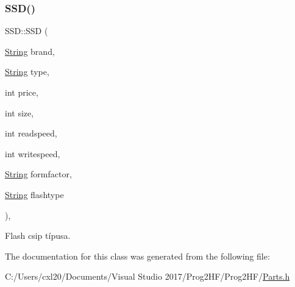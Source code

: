 \subsubsection{\texorpdfstring{SSD()}{SSD()}}
{\footnotesize\ttfamily S\+S\+D\+::\+S\+SD (\begin{DoxyParamCaption}\item[{\mbox{\hyperlink{class_string}{String}}}]{brand,  }\item[{\mbox{\hyperlink{class_string}{String}}}]{type,  }\item[{int}]{price,  }\item[{int}]{size,  }\item[{int}]{readspeed,  }\item[{int}]{writespeed,  }\item[{\mbox{\hyperlink{class_string}{String}}}]{formfactor,  }\item[{\mbox{\hyperlink{class_string}{String}}}]{flashtype }\end{DoxyParamCaption})\hspace{0.3cm}{\ttfamily [inline]}, {\ttfamily [explicit]}}



Flash csip típusa. 



The documentation for this class was generated from the following file\+:\begin{DoxyCompactItemize}
\item 
C\+:/\+Users/cxl20/\+Documents/\+Visual Studio 2017/\+Prog2\+H\+F/\+Prog2\+H\+F/\mbox{\hyperlink{_parts_8h}{Parts.\+h}}\end{DoxyCompactItemize}
